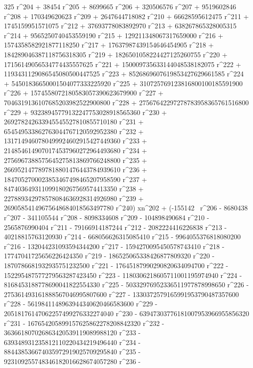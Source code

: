        325 r^204 + 38454 r^205 + 8699665 r^206 + 320506576 r^207 + 
       9519602846 r^208 + 170349620623 r^209 + 2647644718082 r^210 + 
       66628595612475 r^211 + 1745159951571075 r^212 + 
       37693778083892970 r^213 + 638267865328005315 r^214 + 
       9565250740453559190 r^215 + 129211348067317659000 r^216 + 
       1574358582921877118250 r^217 + 17637987439154646454905 r^218 + 
       184289046387118756318305 r^219 + 
       1826501058224427125260755 r^220 + 
       17156149056534774435557625 r^221 + 
       150009735633144048538182075 r^222 + 
       1193431129086545080500447525 r^223 + 
       8526869607619853427629661585 r^224 + 
       54501836650001504077333225920 r^225 + 
       310725769123816800100185591900 r^226 + 
       1574558072180583057390623679900 r^227 + 
       7046319136107685203982522900800 r^228 + 
       27567642297278783958365761516800 r^229 + 
       93238945779132247753028918565360 r^230 + 
       269278242633945545527810855710180 r^231 + 
       654549533862763044767120592952380 r^232 + 
       1317149460780499924602915427449360 r^233 + 
       2148546149070174537960272964493680 r^234 + 
       2756967388575645275813869766248800 r^235 + 
       2669521477897818801476443784939610 r^236 + 
       1847052700023853467498465207958590 r^237 + 
       847403649311099180267569574413350 r^238 + 
       227889342978578084636928314926980 r^239 + 
       26905854149675648684018563497780 r^240) xn^202 + (-155142 \
r^206 - 8680438 r^207 - 341105544 r^208 - 8098334608 r^209 - 
       104898490684 r^210 - 2565876990404 r^211 - 
       79166914187244 r^212 - 2082224416226838 r^213 - 
       40218815763120930 r^214 - 668056626315085410 r^215 - 
       9964055376818080200 r^216 - 132044231093594344200 r^217 - 
       1594270095450578743410 r^218 - 17747041725656226424350 r^219 - 
       186525065338426877809320 r^220 - 
       1870786681932935751232500 r^221 - 
       17645187990290820634094700 r^222 - 
       152295487577279563287423450 r^223 - 
       1180306218605711001195974940 r^224 - 
       8168453188778690041822554330 r^225 - 
       50332976952336511977878998650 r^226 - 
       275361493161888567046995807600 r^227 - 
       1330372579165991953790487357600 r^228 - 
       5619841148963944340620466583600 r^229 - 
       20518176147062257499276332274040 r^230 - 
       63947303776181007953966955856320 r^231 - 
       167654205899157625862278208842320 r^232 - 
       363661807026863420539119089988120 r^233 - 
       639348931235812110220434219496440 r^234 - 
       884438536674035972919025709295840 r^235 - 
       923109255748346182016628674057280 r^236 - 
